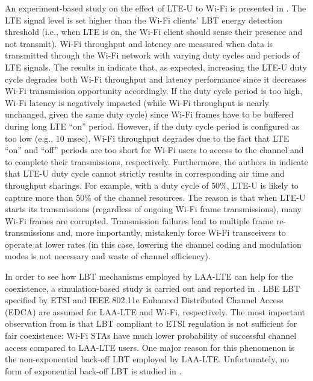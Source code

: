 An experiment-based study on the effect of LTE-U to Wi-Fi is presented in \cite{LTE-U-CableLabs}. The LTE signal level is set higher than the Wi-Fi clients' LBT energy detection threshold (i.e., when LTE is on, the Wi-Fi client should sense their presence and not transmit). Wi-Fi throughput and latency are measured when data is transmitted through the Wi-Fi network with varying duty cycles and periods of LTE signals. The results in \cite{LTE-U-CableLabs} indicate that, as expected, increasing the LTE-U duty cycle degrades both Wi-Fi throughput and latency performance since it decreases Wi-Fi transmission opportunity accordingly. If the duty cycle period is too high, Wi-Fi latency is negatively impacted (while Wi-Fi throughput is nearly unchanged, given the same duty cycle) since Wi-Fi frames have to be buffered during long LTE ``on'' period. However, if the duty cycle period is configured as too low (e.g., $10$ msec), Wi-Fi throughput degrades due to the fact that LTE ``on'' and ``off'' periods are too short for Wi-Fi users to access to the channel and to complete their transmissions, respectively. Furthermore, the authors in \cite{LTE-U-CableLabs} indicate that LTE-U duty cycle cannot strictly results in corresponding air time and throughput sharings. For example, with a duty cycle of $50$\%, LTE-U is likely to capture more than $50$\% of the channel resources. The reason is that when LTE-U starts its transmissions (regardless of ongoing Wi-Fi frame transmissions), many Wi-Fi frames are corrupted. Transmission failures lead to multiple frame re-transmissions and, more importantly, mistakenly force Wi-Fi transceivers to operate at lower rates (in this case, lowering the channel coding and modulation modes is not necessary and waste of channel efficiency).

In order to see how LBT mechanisms employed by LAA-LTE can help for the coexistence, a simulation-based study is carried out and reported in \cite{LBT-CableLabs-2014}. LBE LBT specified by ETSI \cite{LBT-ETSI-2014} and IEEE 802.11e Enhanced Distributed Channel Access (EDCA) are assumed for LAA-LTE and Wi-Fi, respectively. The most important observation from \cite{LBT-CableLabs-2014} is that LBT compliant to ETSI regulation is not sufficient for fair coexistence: Wi-Fi STAs have much lower probability of successful channel access compared to LAA-LTE users. One major reason for this phenomenon is the non-exponential back-off LBT employed by LAA-LTE. Unfortunately, no form of exponential back-off LBT is studied in \cite{LBT-CableLabs-2014}.

